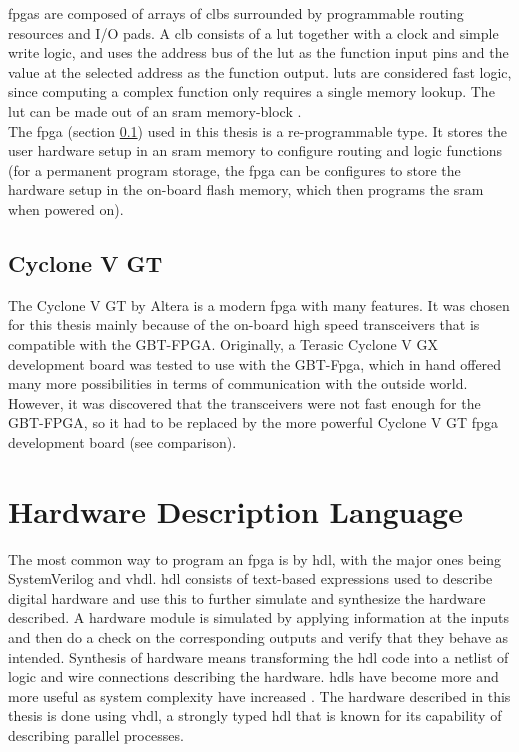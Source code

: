 \documentclass[main.tex]{subfiles}
\begin{document}
\Glspl{fpga} are composed of arrays of \glspl{clb} surrounded by programmable routing resources and I/O pads. A \gls{clb} consists of a \gls{lut} together with a clock and simple write logic, and uses the address bus of the \gls{lut} as the function input pins and the value at the selected address as the function output. \glspl{lut} are considered fast logic, since computing a complex function only requires a single memory lookup. The \gls{lut} can be made out of an \gls{sram} memory-block \cite{weste11}. \\

The \gls{fpga} (section \ref{sec:cyclone}) used in this thesis is a re-programmable type. It stores the user hardware setup in an \gls{sram} memory to configure routing and logic functions (for a permanent program storage, the \gls{fpga} can be configures to store the hardware setup in the on-board \gls{flash} memory, which then programs the \gls{sram} when powered on).

\subsection{Cyclone V GT} \label{sec:cyclone}
The Cyclone V GT by Altera is a modern \gls{fpga} with many features. It was chosen for this thesis mainly because of the on-board high speed transceivers that is compatible with the GBT-FPGA. Originally, a Terasic Cyclone V GX development board was tested to use with the GBT-Fpga, which in hand offered many more possibilities in terms of communication with the outside world. However, it was discovered that the transceivers were not fast enough for the GBT-FPGA, so it had to be replaced by the more powerful Cyclone V GT fpga development board (see comparison).  


\section{Hardware Description Language}
The most common way to program an \gls{fpga} is by \gls{hdl}, with the major ones being SystemVerilog and \acrshort{vhdl}. \Gls{hdl} consists of text-based expressions used to describe digital hardware and use this to further simulate and synthesize the hardware described. A hardware module is simulated by applying information at the inputs and then do a check on the corresponding outputs and verify that they behave as intended. Synthesis of hardware means transforming the \gls{hdl} code into a netlist of logic and wire connections describing the hardware. \glspl{hdl} have become more and more useful as system complexity have increased \cite{weste11}. The hardware described in this thesis is done using \acrshort{vhdl}, a strongly typed \gls{hdl} that is known for its capability of describing parallel processes. 
\end{document}
